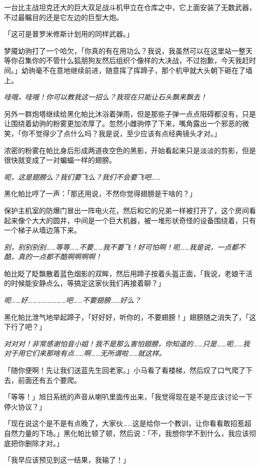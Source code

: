 一台比主战坦克还大的巨大双足战斗机甲立在仓库之中，它上面安装了无数武器，不过最瞩目的还是它左边的巨型大炮。

「这可是普罗米修斯计划用的同样武器。」

梦魇幼驹打了一个哈欠，「你真的有在用功么？我说，我虽然可以在这里站一整天等你召集你的不管什么狐朋狗友然后组织个像样的大决战，不过抱歉，今天我赶时间。」幼驹毫不在意地继续前进，随意挥了挥蹄子，那个机甲就大头朝下砸在了墙上。

\emph{哇哦，哇哦！你可以教我这一招么？我现在只能让石头飘来飘去！}

另外一群炮塔继续给黑化帕比沐浴着弹雨，但是那些子弹一点点阻碍都没有，只是让围绕着幼驹的粉雾更加浓厚了。忽然小雌驹停了下来，嘴角露出一个邪恶的微笑，「你不觉得少了点什么吗？我是说，至少应该有点经典镜头才对。」

浓密的粉雾在帕比身后形成两道夜空色的黑影，开始看起来只是淡淡的剪影，但是很快就变成了一对蝙蝠一样的翅膀。

\emph{呃，这是翅膀么？我们要飞么？我们不会要飞吧……{}}

黑化帕比哼了一声：「那还用说，不然你觉得翅膀是干啥的？」

保护主机室的防爆门冒出一阵电火花，然后和它的兄弟一样被打开了，这个房间看起来像个大大的圆井，中间是一个巨大机器，被一堆形状奇怪的设备围绕着，只有一个梯子从墙边落下来。

\emph{别，别别别别……等等……不要……我不要飞！好可怕啊！呃……我是说，一点都不酷，真的一点都不酷啊啊啊啊！}

帕比眨了眨飘散着蓝色烟影的双眸，然后用蹄子按着头盔正面，「我说，老娘干活的时候能安静点么，等搞定这家伙我们再接着聊？」

\emph{呃……好……………………吧……不要翅膀……好么？}

黑化帕比泄气地举起蹄子，「好好好，听你的，不要翅膀！」翅膀随之消失了，「这下行了吧？」

\emph{对对对！非常感谢怕音小姐！我不是那么害怕翅膀，你知道的……只是……呃……我对于用它们来那啥有点……啊……无所谓啦……就这样。}

「随你便啊！先让我们送蓝先生回老家。」小马看了看楼梯，然后叹了口气爬了下去，前面还有五个要爬。

「等等！」旭日系统的声音从喇叭里面传出来，「我觉得现在是不是应该讨论一下停火协议？」

「现在说这个是不是有点晚了，大家伙……这是给你一个教训，让你看看敢招惹超自然力量的下场。」黑化帕比顿了顿，然后说：「不，我想你学不到什么，我应该彻底把你删除才对。」

「我早应该预见到这一结果，我输了！」

